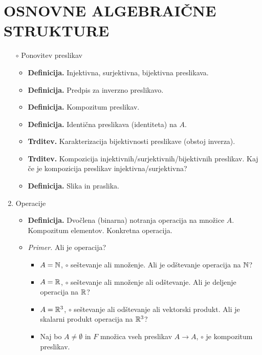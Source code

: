 \section{OSNOVNE ALGEBRAIČNE STRUKTURE}

\begin{enumerate}
    \item[$\circ$] Ponovitev preslikav
    \begin{itemize}
        \item \colorbox{purple!30}{\textbf{Definicija.}} Injektivna, surjektivna, bijektivna preslikava.
        \item \colorbox{purple!30}{\textbf{Definicija.}} Predpis za inverzno preslikavo.
        \item \colorbox{purple!30}{\textbf{Definicija.}} Kompozitum preslikav.
        \item \colorbox{purple!30}{\textbf{Definicija.}} Identična preslikava (identiteta) na $A$.
        \item \colorbox{blue!30}{\textbf{Trditev.}} Karakterizacija bijektivnosti preslikave (obstoj inverza).
        \item \colorbox{blue!30}{\textbf{Trditev.}} Kompozicija injektivnih/surjektivnih/bijektivnih preslikav. Kaj če je kompozicija preslikav injektivna/surjektivna?
        \item \colorbox{purple!30}{\textbf{Definicija.}} Slika in praslika.
    \end{itemize}
    \item Operacije
    \begin{itemize}
        \item \colorbox{purple!30}{\textbf{Definicija.}} Dvočlena (binarna) notranja operacija na množice $A$. Kompozitum elementov. Konkretna operacija.
        \item \colorbox{yellow!30}{\emph{Primer.}} Ali je operacija?
        \begin{itemize}
            \item $A=\mathbb{N}$, $\circ$ seštevanje ali množenje. Ali je odštevanje operacija na $\mathbb{N}$?
            \item $A=\mathbb{R}$, $\circ$ seštevanje ali množenje ali odštevanje. Ali je deljenje operacija na $\mathbb{R}$?
            \item $A=\mathbb{R}^3$, $\circ$ seštevanje ali odštevanje ali vektorski produkt. Ali je skalarni produkt operacija na $\mathbb{R}^3$?
            \item Naj bo $A \neq \emptyset$ in $F$ množica vseh preslikav $A \to A$, $\circ$ je kompozitum preslikav.

\end{itemize}
\end{itemize}
\end{enumerate}
